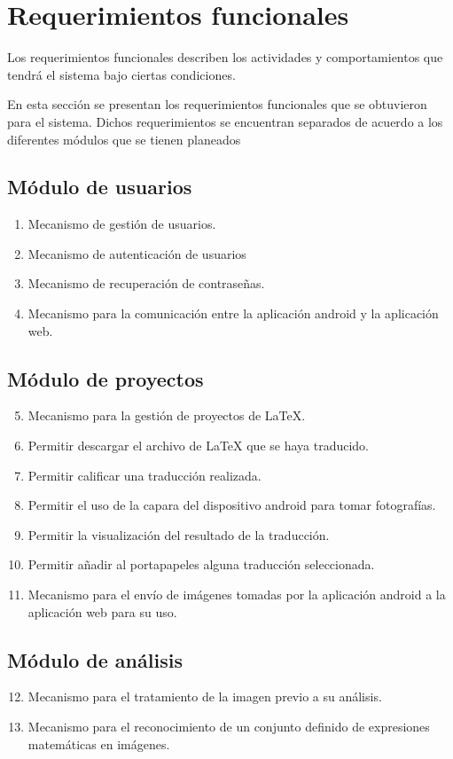 \section{Requerimientos funcionales}
    Los requerimientos funcionales describen los actividades y comportamientos que tendrá el sistema bajo ciertas condiciones.
    
    En esta sección se presentan los requerimientos funcionales que se obtuvieron para el sistema. Dichos requerimientos se encuentran separados de acuerdo a los diferentes módulos que se tienen planeados
    \subsection{Módulo de usuarios}
    \begin{enumerate}[label=RF\arabic*.]
    \item Mecanismo de gestión de usuarios.
    \item Mecanismo de autenticación de usuarios
    \item Mecanismo de recuperación de contraseñas.
    \item Mecanismo para la comunicación entre la aplicación android y la aplicación web.
    \end{enumerate}
    
    \subsection{Módulo de proyectos}
    \begin{enumerate}[label=RF\arabic*.]
    	\setcounter{enumi}{4}
    	\item Mecanismo para la gestión de proyectos de \LaTeX{}.
    	\item Permitir descargar el archivo de \LaTeX{} que se haya traducido.
    	\item Permitir calificar una traducción realizada.
    	\item Permitir el uso de la capara del dispositivo android para tomar fotografías.
    	\item Permitir la visualización del resultado de la traducción.
    	\item Permitir añadir al portapapeles alguna traducción seleccionada.
    	\item Mecanismo para el envío de imágenes tomadas por la aplicación android a la aplicación web para su uso.
    \end{enumerate}
    
    \subsection{Módulo de análisis}
    \begin{enumerate}[label=RF\arabic*.]
    	\setcounter{enumi}{11}
    	\item Mecanismo para el tratamiento de la imagen previo a su análisis.
    	\item Mecanismo para el reconocimiento de un conjunto definido de expresiones matemáticas en imágenes.
    \end{enumerate}
    
